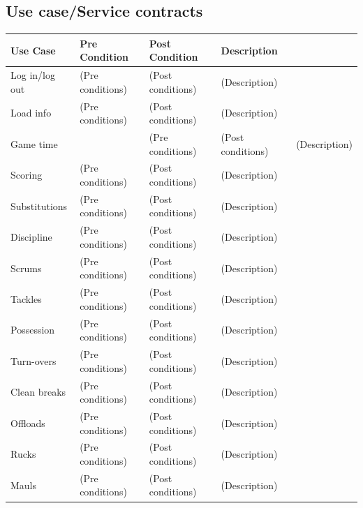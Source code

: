 \documentclass[a4paper,12pt]{report}
\begin{document}
{\begin{itemize}
\subsection{Use case/Service contracts}
\begin{center}
  \begin{longtable}{| p{3cm} | p{4cm} | p{4cm} | p{4cm} |}
    \hline
    Use Case & Pre Condition & Post Condition & Description \\ \hline \hline
    Log in/log out & (Pre conditions) & (Post conditions) & (Description)\\ \hline
    Load info & (Pre conditions) & (Post conditions)  & (Description) \\ \hline
    Game time & & (Pre conditions) & (Post conditions)  & (Description) \\ \hline
    Scoring & (Pre conditions) & (Post conditions) & (Description)\\ \hline
    Substitutions & (Pre conditions) & (Post conditions) & (Description)\\ \hline
    Discipline & (Pre conditions) & (Post conditions) & (Description)\\ \hline
    Scrums & (Pre conditions) & (Post conditions) & (Description)\\ \hline
    Tackles & (Pre conditions) & (Post conditions) & (Description)\\ \hline
    Possession & (Pre conditions) & (Post conditions) & (Description)\\ \hline
    Turn-overs & (Pre conditions) & (Post conditions) & (Description)\\ \hline
    Clean breaks & (Pre conditions) & (Post conditions) & (Description)\\ \hline
    Offloads & (Pre conditions) & (Post conditions) & (Description)\\ \hline
    Rucks & (Pre conditions) & (Post conditions) & (Description)\\ \hline
    Mauls & (Pre conditions) & (Post conditions) & (Description)\\ \hline

    \hline
  \end{longtable}
\end{center}
\newpage

\end{itemize}}
\end{document}
